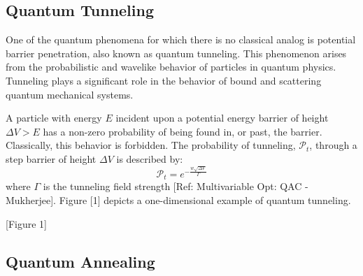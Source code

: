 \documentclass[11pt]{afthesis}
\begin{document}
\subsection{Quantum Tunneling} 



One of the quantum phenomena for which there is no classical analog is potential barrier penetration, also known as quantum tunneling. This phenomenon arises from the probabilistic and wavelike behavior of particles in quantum physics. Tunneling plays a significant role in the behavior of bound and scattering quantum mechanical systems.

A particle with energy \begin{math} E \end{math} incident upon a potential energy barrier of height \begin{math} \Delta V > E  \end{math} has a non-zero probability of being found in, or past, the barrier. Classically, this behavior is forbidden. The probability of tunneling, \begin{math} \mathcal{P}_t \end{math}, through a step barrier of height \begin{math} \Delta V  \end{math} is described by: 
\begin{equation}
\mathcal{P}_t = e^{-\frac{w \sqrt{\Delta V}}{ \Gamma}} 
\end{equation} where \begin{math} \Gamma \end{math} is the tunneling field strength [Ref: Multivariable Opt: QAC - Mukherjee]. Figure [1] depicts a one-dimensional example of quantum tunneling.

[Figure 1] 



\subsection{Quantum Annealing}
\end{document}
